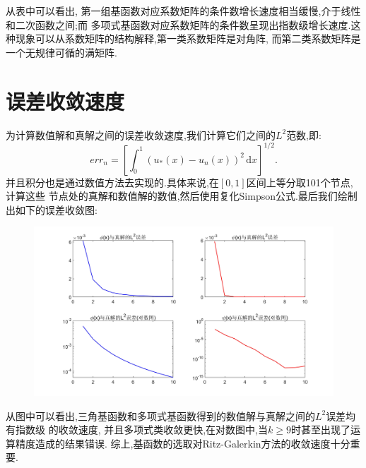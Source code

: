 \documentclass[11pt,reqno]{article}
\numberwithin{equation}{section}
\renewcommand{\d}{\,\mathrm d}
\begin{document}
从表中可以看出, 第一组基函数对应系数矩阵的条件数增长速度相当缓慢,介于线性和二次函数之间;而
多项式基函数对应系数矩阵的条件数呈现出指数级增长速度.这种现象可以从系数矩阵的结构解释,第一类系数矩阵是对角阵,
而第二类系数矩阵是一个无规律可循的满矩阵.



\section{误差收敛速度}

为计算数值解和真解之间的误差收敛速度,我们计算它们之间的$L^2$范数,即:
\begin{equation}
err_n=\left[\int_{0}^{1}(u_*(x)-u_n(x))^2\d x\right]^{1/2}.
\end{equation}
并且积分也是通过数值方法去实现的.具体来说,在$[0,1]$区间上等分取101个节点,计算这些
节点处的真解和数值解的数值,然后使用复化Simpson公式.最后我们绘制出如下的误差收敛图:

\begin{figure}[h]
	\begin{center}
		\includegraphics[width=1\textwidth]{pic3.jpg}
	\end{center}
\end{figure}

从图中可以看出,三角基函数和多项式基函数得到的数值解与真解之间的$L^2$误差均有指数级
的收敛速度, 并且多项式类收敛更快,在对数图中,当$k\ge9$时甚至出现了运算精度造成的结果错误.
综上,基函数的选取对Ritz-Galerkin方法的收敛速度十分重要.
\end{document}
